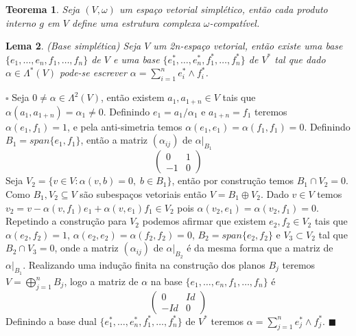 \documentclass[12pt]{book}
\newtheorem{teorema}{Teorema}[section]
\newtheorem{lema}[teorema]{Lema}
\newenvironment{prova}[1]{$\square$ #1}{\hfill$\blacksquare$}
\newcommand{\vermelho}[1]{{\color{red}#1}}
\begin{document}
	\begin{teorema}
		\vermelho{
			Seja $(V, \omega)$ um espaço vetorial simplético, então cada produto interno $g$ em $V$ define uma estrutura complexa $\omega$-compatível.}
	\end{teorema}
	
	\begin{lema}
		(Base simplética) Seja $V$ um 2n-espaço vetorial, então existe uma base $\{ e_{1},\dots, e_{n}, f_{1},\dots, f_{n}\}$ de $V$ e uma base $\{e_{1}^{*}, \dots, e_{n}^{*}, f_{1}^{*}, \dots,f_{n}^{*}\}$ de $V^{*}$ tal que dado $\alpha \in \Lambda^{*}(V)$ pode-se escrever $\alpha = \sum_{i=1}^{n} e^{*}_{i}\wedge f^{*}_{i}$.
	\end{lema}
	\begin{prova}
		Seja $0\neq \alpha \in \Lambda^{2}(V) $, então existem $ a_{1}, a_{1+n} \in V $ tais que $\alpha(a_{1}, a_{1+n}) = \alpha_{1} \neq 0$. Definindo $e_{1} = a_{1}/\alpha_{1}$ e $a_{1+n} = f_{1}$ teremos $\alpha(e_{1}, f_{1}) = 1$, e pela anti-simetria temos $\alpha(e_{1}, e_{1}) = \alpha(f_{1}, f_{1}) = 0$. Definindo $B_{1}=span \{e_{1}, f_{1}\}$, então a matriz $(\alpha_{ij})$ de $\alpha|_{B_{1}}$
		$$
		\left(
		\begin{array}{cc}
		0 & 1
		\\
		-1 & 0
		\end{array}
		\right)
		$$
		Seja  $V_{2} = \{v \in V: \alpha(v, b) = 0,\; b \in B_{1}\}$, então por construção temos $B_{1} \cap V_{2} = 0$. Como $B_{1}, V_{2} \subseteq V$ são subespaços vetoriais então $V = B_{1}\oplus V_{2}$. Dado $v \in V$ temos $v_{2} =v- \alpha(v,f_{1})e_{1} +\alpha(v,e_{1})f_{1} \in V_{2}$ pois $\alpha(v_{2}, e_{1}) = \alpha(v_{2}, f_{1}) = 0$. Repetindo a construção para $V_{2}$ podemos afirmar que existem $e_{2}, f_{2} \in V_{2}$ tais que $\alpha(e_{2}, f_{2}) = 1$, $\alpha(e_{2}, e_{2}) = \alpha(f_{2}, f_{2}) = 0$, $B_{2} = span\{e_{2}, f_{2} \}$ e $V_{3} \subset V_{2}$ tal que $B_{2}\cap V_{3}=0$, onde a matriz $(\alpha_{ij})$ de $\alpha|_{B_{2}}$ é da mesma forma que a matriz de $\alpha|_{B_{1}}$. Realizando uma indução finita na construção dos planos $B_{j}$ teremos $V = \bigoplus_{j=1}^{n}B_{j}$, logo a matriz de $\alpha$ na base  $\{ e_{1},\dots, e_{n}, f_{1},\dots, f_{n}\}$ é
		$$
		\left(
		\begin{array}{cc}
		0 & Id
		\\
		-Id & 0
		\end{array}
		\right)
		$$
		Definindo a base dual $\{e_{1}^{*}, \dots, e_{n}^{*}, f_{1}^{*}, \dots,f_{n}^{*}\}$ de $V^{*}$ teremos $\alpha = \sum_{j=1}^{n}e_{j}^{*}\wedge f_{j}^{*}$.
	\end{prova}
	
\end{document}
